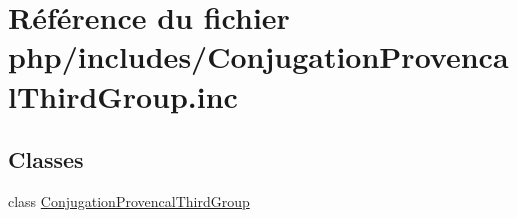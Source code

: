 \hypertarget{_conjugation_provencal_third_group_8inc}{}\section{Référence du fichier php/includes/\+Conjugation\+Provencal\+Third\+Group.inc}
\label{_conjugation_provencal_third_group_8inc}
\subsection*{Classes}
\begin{DoxyCompactItemize}
\item 
class \hyperlink{class_conjugation_provencal_third_group}{Conjugation\+Provencal\+Third\+Group}
\end{DoxyCompactItemize}
